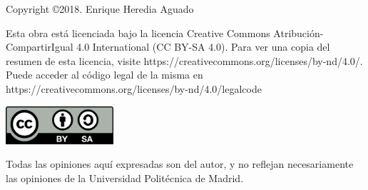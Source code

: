 \begin{flushleft}

Copyright \copyright  2018. Enrique Heredia Aguado


Esta obra está licenciada bajo la licencia Creative Commons Atribución-CompartirIgual 4.0 International (CC BY-SA 4.0). Para ver una copia del resumen de esta licencia, visite https://creativecommons.org/licenses/by-nd/4.0/. Puede acceder al código legal de la misma en https://creativecommons.org/licenses/by-nd/4.0/legalcode


\includegraphics[width=0.3\textwidth]{figuras/ccbysa.png}


Todas las opiniones aquí expresadas son del autor, y no reflejan necesariamente las opiniones
de la Universidad Politécnica de Madrid.

\end{flushleft}
